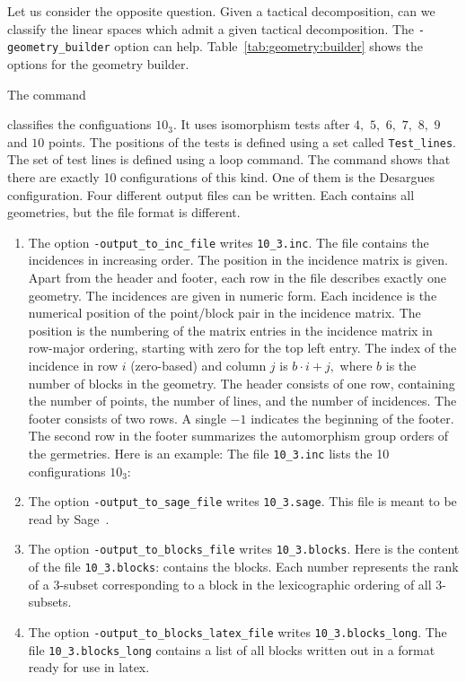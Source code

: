 Let us consider the opposite question. 
Given a tactical decomposition, 
can we classify the linear spaces which admit a given tactical decomposition.
The \verb'-geometry_builder' option can help. 
Table~\ref{tab:geometry:builder} shows the options for the geometry builder.


\bigskip

The command 


classifies the configuations $10_3$. 
It uses isomorphism tests after $4,$ $5,$ $6,$ $7,$ $8,$ $9$ and $10$ points.
The positions of the tests is defined using a set called \verb'Test_lines'. 
The set of test lines is defined using a loop command.
The command shows that 
there are exactly 10 configurations of this kind. 
One of them is the Desargues configuration. 
Four different output files can be written.
Each contains all geometries, but the file format is different.
\begin{enumerate}
\item
The option \verb'-output_to_inc_file'
writes \verb'10_3.inc'. 
The file contains the incidences in increasing order. 
The position in the incidence matrix is given.
Apart from the header and footer, 
each row in the file describes exactly one geometry.
The incidences are given in numeric form. 
Each incidence is the numerical position of the point/block pair in the 
incidence matrix. 
The position is the numbering of the matrix entries 
in the incidence matrix in row-major ordering, 
starting with zero for the top left entry. 
The index of the incidence in row $i$ (zero-based) 
and column $j$  is $b\cdot i + j,$ 
where $b$ is the number of blocks in the geometry.
The header consists of one row, containing the number of points, 
the number of lines, and the number of incidences.
The footer consists of two rows. 
A single $-1$ indicates the beginning of the footer.
The second row in the footer summarizes the automorphism group orders of the germetries.
Here is an example:
The file \verb'10_3.inc' lists the 10 configurations $10_3$:
\item
The option \verb'-output_to_sage_file'
writes \verb'10_3.sage'. 
This file is meant to be read by Sage~\cite{SteinJoyner2005}.
\item
The option \verb'-output_to_blocks_file'
writes \verb'10_3.blocks'. 
Here is the content of the file \verb'10_3.blocks':
contains the blocks. 
Each number represents the rank of a 3-subset corresponding to a block 
in the lexicographic ordering of all 3-subsets. 
\item
The option \verb'-output_to_blocks_latex_file'
writes \verb'10_3.blocks_long'. 
The file 
\verb'10_3.blocks_long' contains a list of all blocks 
written out in a format ready for use in latex.
\end{enumerate}

